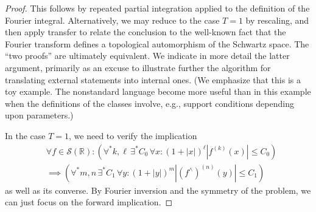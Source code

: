 \documentclass[reqno]{amsart}
\theoremstyle{plain} \newtheorem{theorem} {Theorem}
\theoremstyle{definition} \newtheorem{definition} [theorem] {Definition}
\theoremstyle{itplain} %
\numberwithin{equation}{section}
\numberwithin{theorem}{section}
\renewcommand{\leq}{\leqslant}
\begin{document}
\begin{proof}
  This follows by repeated partial integration applied to the definition of the Fourier integral.  Alternatively, we may reduce to the case $T = 1$ by rescaling, and then apply transfer to relate the conclusion to the well-known fact that the Fourier transform defines a topological automorphism of the Schwartz space.  The ``two proofs'' are ultimately equivalent.  We indicate in more detail the latter argument, primarily as an excuse to illustrate further the algorithm for translating external statements into internal ones.  (We emphasize that this is a toy example.  The nonstandard language become more useful than in this example when the definitions of the classes involve, e.g., support conditions depending upon parameters.)

  In the case $T = 1$, we need to verify the implication
  \begin{align*}
    &\forall f \in \mathcal{S}(\mathbb{R}) : 
    (  \forall^* k,  \ell \,
    \exists^* C_0 \,
    \forall x :
    (1 + |x|)^\ell |f^{(k)}(x)| \leq C_0
      )
      \\
    &\implies
    (  \forall^* m,  n \,
    \exists^* C_1 \,
    \forall y :
    (1 + |y|)^m |(f^\wedge)^{(n)}(y)| \leq C_1
    )
  \end{align*}
  as well as its converse.  By Fourier inversion and the symmetry of the problem, we can just focus on the forward implication.


\end{proof}
\end{document}

